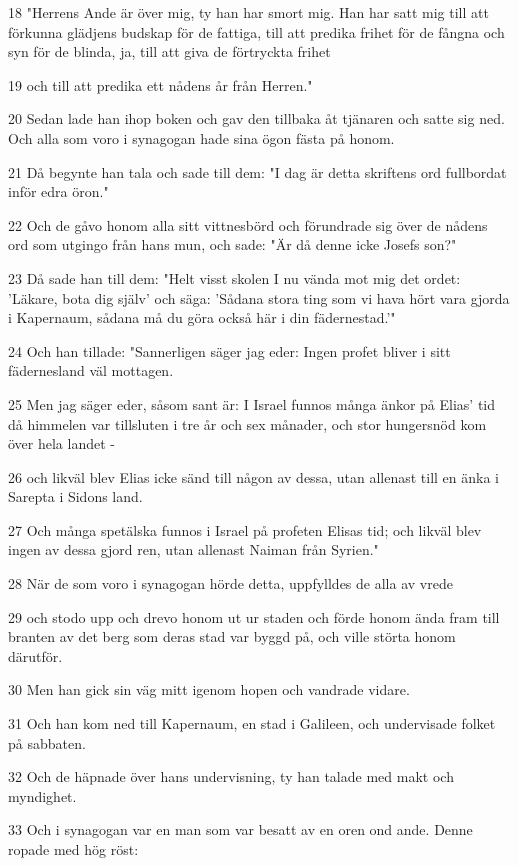 \par 18 "Herrens Ande är över mig, ty han har smort mig. Han har satt mig till att förkunna glädjens budskap för de fattiga, till att predika frihet för de fångna och syn för de blinda, ja, till att giva de förtryckta frihet
\par 19 och till att predika ett nådens år från Herren."
\par 20 Sedan lade han ihop boken och gav den tillbaka åt tjänaren och satte sig ned. Och alla som voro i synagogan hade sina ögon fästa på honom.
\par 21 Då begynte han tala och sade till dem: "I dag är detta skriftens ord fullbordat inför edra öron."
\par 22 Och de gåvo honom alla sitt vittnesbörd och förundrade sig över de nådens ord som utgingo från hans mun, och sade: "Är då denne icke Josefs son?"
\par 23 Då sade han till dem: "Helt visst skolen I nu vända mot mig det ordet: 'Läkare, bota dig själv' och säga: 'Sådana stora ting som vi hava hört vara gjorda i Kapernaum, sådana må du göra också här i din fädernestad.'"
\par 24 Och han tillade: "Sannerligen säger jag eder: Ingen profet bliver i sitt fädernesland väl mottagen.
\par 25 Men jag säger eder, såsom sant är: I Israel funnos många änkor på Elias' tid då himmelen var tillsluten i tre år och sex månader, och stor hungersnöd kom över hela landet -
\par 26 och likväl blev Elias icke sänd till någon av dessa, utan allenast till en änka i Sarepta i Sidons land.
\par 27 Och många spetälska funnos i Israel på profeten Elisas tid; och likväl blev ingen av dessa gjord ren, utan allenast Naiman från Syrien."
\par 28 När de som voro i synagogan hörde detta, uppfylldes de alla av vrede
\par 29 och stodo upp och drevo honom ut ur staden och förde honom ända fram till branten av det berg som deras stad var byggd på, och ville störta honom därutför.
\par 30 Men han gick sin väg mitt igenom hopen och vandrade vidare.
\par 31 Och han kom ned till Kapernaum, en stad i Galileen, och undervisade folket på sabbaten.
\par 32 Och de häpnade över hans undervisning, ty han talade med makt och myndighet.
\par 33 Och i synagogan var en man som var besatt av en oren ond ande. Denne ropade med hög röst:
